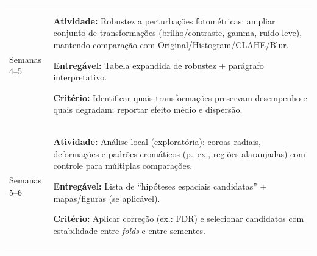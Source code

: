 \documentclass[12pt,a4paper]{article}
\begin{document}
\begin{table}[htbp]
\begin{tabularx}{\textwidth}{p{} >{\raggedright\arraybackslash}X}
Semanas 4--5 &
\textbf{Atividade:} Robustez a perturbações fotométricas: ampliar conjunto de transformações (brilho/contraste, gamma, ruído leve), mantendo comparação com Original/Histogram/CLAHE/Blur. \par
\textbf{Entregável:} Tabela expandida de robustez + parágrafo interpretativo. \par
\textbf{Critério:} Identificar quais transformações preservam desempenho e quais degradam; reportar efeito médio e dispersão. \\
\addlinespace[8pt]

Semanas 5--6 &
\textbf{Atividade:} Análise local (exploratória): coroas radiais, deformações e padrões cromáticos (p.\ ex., regiões alaranjadas) com controle para múltiplas comparações. \par
\textbf{Entregável:} Lista de ``hipóteses espaciais candidatas'' + mapas/figuras (se aplicável). \par
\textbf{Critério:} Aplicar correção (ex.: FDR) e selecionar candidatos com estabilidade entre \textit{folds} e entre sementes. \\
\addlinespace[8pt]

\end{tabularx}
\end{table}
\end{document}
